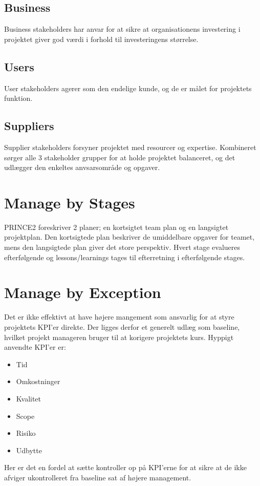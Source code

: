 \subsection{Business}
\label{sec:stakeholder_business}
Business stakeholders har anvar for at sikre at organisationens investering i projektet giver god værdi i forhold til investeringens størrelse.

\subsection{Users}
\label{sec:stakeholder_users}
User stakeholders agerer som den endelige kunde, og de er målet for projektets funktion.

\subsection{Suppliers}
\label{sec:stakeholder_suppliers}
Supplier stakeholders forsyner projektet med resourcer og expertise. Kombineret sørger alle 3 stakeholder grupper for at holde projektet balanceret, og det udlægger den enkeltes anvsarsområde og opgaver.

\section{Manage by Stages}
PRINCE2 foreskriver 2 planer; en kortsigtet team plan og en langsigtet projektplan. Den kortsigtede plan beskriver de umiddelbare opgaver for teamet, mens den langsigtede plan giver det store perspektiv. Hvert stage evalueres efterfølgende og lessons/learnings tages til efterretning i efterfølgende stages.

\section{Manage by Exception}
Det er ikke effektivt at have højere mangement som ansvarlig for at styre projektets KPI'er direkte. Der ligges derfor et generelt udlæg som baseline, hvilket projekt manageren bruger til at korigere projektets kurs. Hyppigt anvendte KPI'er er:
\begin{itemize}
    \item Tid
    \item Omkostninger
    \item Kvalitet
    \item Scope
    \item Risiko
    \item Udbytte
\end{itemize}
Her er det en fordel at sætte kontroller op på KPI'erne for at sikre at de ikke afviger ukontrolleret fra baseline sat af højere management.

